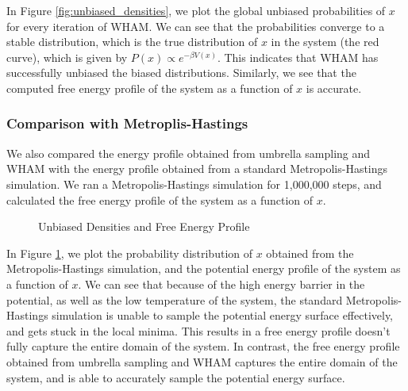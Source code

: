 \documentclass{article}
\begin{document}
In Figure \ref{fig:unbiased_densities}, we plot the global unbiased probabilities of $x$ for every iteration of WHAM. We can see that the probabilities converge to a stable distribution, which is the true distribution of $x$ in the system (the red curve), which is given by $P(x) \propto e^{-\beta V(x)}$. This indicates that WHAM has successfully unbiased the biased distributions. Similarly, we see that the computed free energy profile of the system as a function of $x$ is accurate.

\subsubsection{Comparison with Metroplis-Hastings}

We also compared the energy profile obtained from umbrella sampling and WHAM with the energy profile obtained from a standard Metropolis-Hastings simulation. We ran a Metropolis-Hastings simulation for 1,000,000 steps, and calculated the free energy profile of the system as a function of $x$.

\begin{figure}%
    \centering
    \qquad
    \caption{Unbiased Densities and Free Energy Profile}%
    \label{fig:metro_hastings_plot}%
\end{figure}

In Figure \ref{fig:metro_hastings_plot}, we plot the probability distribution of $x$ obtained from the Metropolis-Hastings simulation, and the potential energy profile of the system as a function of $x$. We can see that because of the high energy barrier in the potential, as well as the low temperature of the system, the standard Metropolis-Hastings simulation is unable to sample the potential energy surface effectively, and gets stuck in the local minima. This results in a free energy profile doesn't fully capture the entire domain of the system. In contrast, the free energy profile obtained from umbrella sampling and WHAM captures the entire domain of the system, and is able to accurately sample the potential energy surface.
\end{document}
